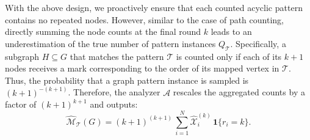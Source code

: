 \begin{algorithm}
\small
\caption{Local client $\widehat{\mathcal{R}}^{(\ell)}$ of $\widehat{\mathcal{M}}_\mathcal{T}$}
\label{alg:pattern_nondp}
\SetNoFillComment


\end{algorithm}


With the above design, we proactively ensure that each counted acyclic pattern contains no repeated nodes. 
However, similar to the case of path counting, directly summing the node counts at the final round $k$ leads to an underestimation of the true number of pattern instances $Q_\mathcal{T}$.  
Specifically, a subgraph $H \subseteq G$ that matches the pattern $\mathcal{T}$ is counted only if each of its $k+1$ nodes receives a mark corresponding to the order of its mapped vertex in $\mathcal{T}$.  
Thus, the probability that a graph pattern instance is sampled is $(k+1)^{-(k+1)}$.  
Therefore, the analyzer $\mathcal{A}$ rescales the aggregated counts by a factor of $(k+1)^{k+1}$ and outputs:
\begin{equation*}
    \widehat{\mathcal{M}}_\mathcal{T}(G) = (k+1)^{(k+1)} \,
    \sum_{i=1}^N \widehat{\mathcal{X}}_i^{(k)} \, \mathbf{1}\{r_i =k\}.
\end{equation*}


